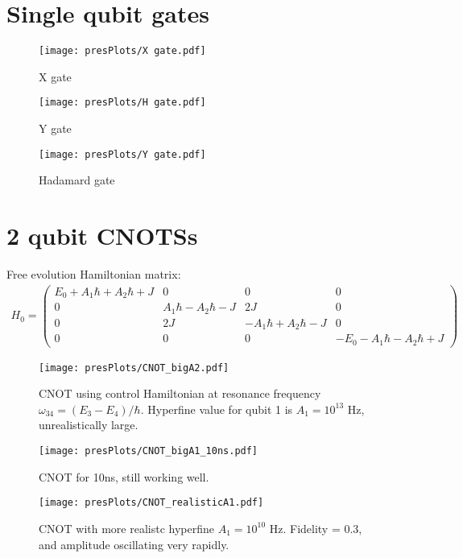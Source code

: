 \documentclass[12pt]{article}
\begin{document}
\section{Single qubit gates}
\begin{figure}[H]
    \centering
    \texttt{[image: presPlots/X gate.pdf]}
    \caption{X gate}
    \label{fig:my_label}
\end{figure}
\begin{figure}[H]
    \centering
    \texttt{[image: presPlots/H gate.pdf]}
    \caption{Y gate}
    \label{fig:my_label}
\end{figure}

\begin{figure}[H]
    \centering
    \texttt{[image: presPlots/Y gate.pdf]}
    \caption{Hadamard gate}
    \label{fig:my_label}
\end{figure}

\section{2 qubit CNOTSs}

Free evolution Hamiltonian matrix:
\begin{align}
    H_0 = \begin{pmatrix}
    E_0+A_1\hbar+A_2\hbar+J &0 &0 &0\\
    0 &A_1\hbar-A_2\hbar-J &2J &0\\ 
    0 &2J &-A_1\hbar+A_2\hbar-J &0 \\ 
    0 &0 &0 &-E_0-A_1\hbar-A_2\hbar+J
    \end{pmatrix}
\end{align}



\begin{figure}[H]
    \centering
    \texttt{[image: presPlots/CNOT\_bigA2.pdf]}
    \caption{CNOT using control Hamiltonian at resonance frequency $\omega_{34}=(E_3-E_4)/\hbar$. Hyperfine value for qubit 1 is $A_1=10^{13}$ Hz, unrealistically large.}
    \label{fig:my_label}
\end{figure}

\begin{figure}[H]
    \centering
    \texttt{[image: presPlots/CNOT\_bigA1\_10ns.pdf]}
    \caption{CNOT for 10ns, still working well.}
    \label{fig:my_label}
\end{figure}

\begin{figure}[H]
    \centering
    \texttt{[image: presPlots/CNOT\_realisticA1.pdf]}
    \caption{CNOT with more realistc hyperfine $A_1=10^{10}$ Hz. Fidelity = 0.3, and amplitude oscillating very rapidly.}
    \label{fig:my_label}
\end{figure}
\end{document}
